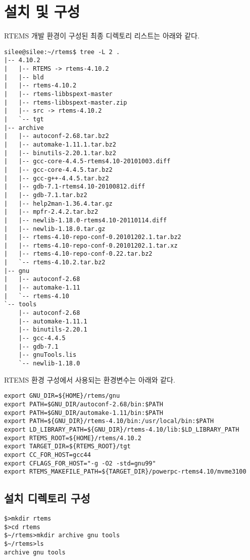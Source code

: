 \documentclass[11pt
  , a4paper
  , article
  , oneside
]{memoir}
\begin{document}
\section{설치 및 구성}
RTEMS 개발 환경\cite{rtems_install}이 구성된 최종 디렉토리 리스트는 아래와 같다.

\begin{lstlisting}[style=termstyle]
silee@silee:~/rtems$ tree -L 2 .
|-- 4.10.2
|   |-- RTEMS -> rtems-4.10.2
|   |-- bld
|   |-- rtems-4.10.2
|   |-- rtems-libbspext-master
|   |-- rtems-libbspext-master.zip
|   |-- src -> rtems-4.10.2
|   `-- tgt
|-- archive
|   |-- autoconf-2.68.tar.bz2
|   |-- automake-1.11.1.tar.bz2
|   |-- binutils-2.20.1.tar.bz2
|   |-- gcc-core-4.4.5-rtems4.10-20101003.diff
|   |-- gcc-core-4.4.5.tar.bz2
|   |-- gcc-g++-4.4.5.tar.bz2
|   |-- gdb-7.1-rtems4.10-20100812.diff
|   |-- gdb-7.1.tar.bz2
|   |-- help2man-1.36.4.tar.gz
|   |-- mpfr-2.4.2.tar.bz2
|   |-- newlib-1.18.0-rtems4.10-20110114.diff
|   |-- newlib-1.18.0.tar.gz
|   |-- rtems-4.10-repo-conf-0.20101202.1.tar.bz2
|   |-- rtems-4.10-repo-conf-0.20101202.1.tar.xz
|   |-- rtems-4.10-repo-conf-0.22.tar.bz2
|   `-- rtems-4.10.2.tar.bz2
|-- gnu
|   |-- autoconf-2.68
|   |-- automake-1.11
|   `-- rtems-4.10
`-- tools
	|-- autoconf-2.68
	|-- automake-1.11.1
	|-- binutils-2.20.1
	|-- gcc-4.4.5
	|-- gdb-7.1
	|-- gnuTools.lis
	`-- newlib-1.18.0
\end{lstlisting}

RTEMS 환경 구성에서 사용되는 환경변수는 아래와 같다.
\begin{lstlisting}[style=termstyle]
export GNU_DIR=${HOME}/rtems/gnu
export PATH=$GNU_DIR/autoconf-2.68/bin:$PATH
export PATH=$GNU_DIR/automake-1.11/bin:$PATH
export PATH=${GNU_DIR}/rtems-4.10/bin:/usr/local/bin:$PATH
export LD_LIBRARY_PATH=${GNU_DIR}/rtems-4.10/lib:$LD_LIBRARY_PATH
export RTEMS_ROOT=${HOME}/rtems/4.10.2
export TARGET_DIR=${RTEMS_ROOT}/tgt
export CC_FOR_HOST=gcc44
export CFLAGS_FOR_HOST="-g -O2 -std=gnu99"
export RTEMS_MAKEFILE_PATH=${TARGET_DIR}/powerpc-rtems4.10/mvme3100
\end{lstlisting}

\subsection*{설치 디렉토리 구성}
\begin{lstlisting}[style=termstyle]
$>mkdir rtems
$>cd rtems
$~/rtems>mkdir archive gnu tools
$~/rtems>ls
archive gnu tools
\end{lstlisting}
\end{document}
